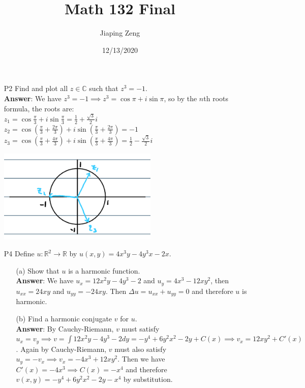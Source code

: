 \documentclass{article}
\title{Math 132 Final}
\author{Jiaping Zeng}
\date{12/13/2020}
\begin{document}

\newpage
\begin{itemize}
      \item [P2] Find and plot all $z\in\mathbb{C}$ such that $z^3=-1$.\\
            \textbf{Answer}: We have $z^3=-1\implies z^3=\cos\pi+i\sin\pi$, so by the $n$th roots formula, the roots are:\\
            $z_1=\cos\frac{\pi}{3}+i\sin\frac{\pi}{3}=\frac{1}{2}+\frac{\sqrt{3}}{2}i$\\
            $z_2=\cos(\frac{\pi}{3}+\frac{2\pi}{3})+i\sin(\frac{\pi}{3}+\frac{2\pi}{3})=-1$\\
            $z_3=\cos(\frac{\pi}{3}+\frac{4\pi}{3})+i\sin(\frac{\pi}{3}+\frac{4\pi}{3})=\frac{1}{2}-\frac{\sqrt{3}}{2}i$
            \begin{center}
                  \includegraphics[width=3in]{p2.png}
            \end{center}
\end{itemize}

\newpage
\begin{itemize}
      \item [P4] Define $u:\mathbb{R}^2\rightarrow\mathbb{R}$ by $u(x,y)=4x^3y-4y^3x-2x$.
            \begin{itemize}
                  \item [(a)] Show that $u$ is a harmonic function.\\
                        \textbf{Answer}: We have $u_x=12x^2y-4y^3-2$ and $u_y=4x^3-12xy^2$, then $u_{xx}=24xy$ and $u_{yy}=-24xy$. Then $\Delta u=u_{xx}+u_{yy}=0$ and therefore $u$ is harmonic.
                  \item [(b)] Find a harmonic conjugate $v$ for $u$.\\
                        \textbf{Answer}: By Cauchy-Riemann, $v$ must satisfy $u_x=v_y\implies v=\int 12x^2y-4y^3-2dy=-y^4+6y^2x^2-2y+C(x)\implies v_x=12xy^2+C'(x)$. Again by Cauchy-Riemann, $v$ must also satisfy $u_y=-v_x\implies v_x=-4x^3+12xy^2$. Then we have $C'(x)=-4x^3\implies C(x)=-x^4$ and therefore $v(x,y)=-y^4+6y^2x^2-2y-x^4$ by substitution.
            \end{itemize}
\end{itemize}
\end{document}

